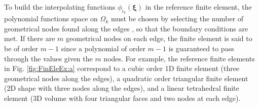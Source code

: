 To build the interpolating functions $\phi_{i_k}(\boldsymbol{\xi})$ in the reference finite element, the polynomial functions space on $\Omega_k$ must be chosen by selecting the number of geometrical nodes found along the  edges \cite{larson_finite_2013}, so that the boundary conditions are met. If there are $m$ geometrical nodes on each edge, the finite element is said to be of order $m-1$ since a polynomial of order $m-1$ is guaranteed to pass through the values given the  $m$ nodes. For example, the reference finite elements in Fig. \ref{fig:FinEleEx:a} correspond to a cubic order 1D finite element (three geometrical nodes along the edges), a quadratic order triangular finite element (2D shape with three nodes along the edges), and a linear tetrahedral finite element (3D volume with four triangular faces and two nodes at each edge).

